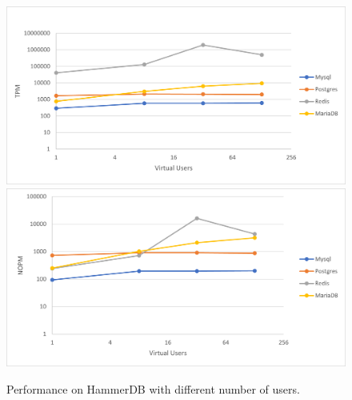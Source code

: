 \begin{figure}[h!]
\centering
\caption{Performance on HammerDB with different number of users.}
\includegraphics[width=0.76\columnwidth]{results/vu/TPM.png}
\includegraphics[width=0.76\columnwidth]{results/vu/NOPM.png}
\label{fig:vuhammer}	
\end{figure}

